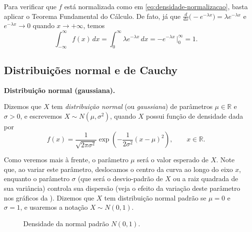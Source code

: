 \documentclass[12pt,portuguese]{article}
\theoremstyle{definition}
\theoremstyle{plainexercise}
\theoremstyle{starredexercise}
\theoremstyle{definition}
\begin{document}
Para verificar que $f$ está normalizada como em \eqref{eq:densidade-normalizacao},
basta aplicar o Teorema Fundamental do Cálculo. De fato, já que 
$\frac{d}{dx}\bigl(-e^{-\lambda x}\bigr) = \lambda e^{-\lambda x}$ e
$e^{-\lambda x}\to 0$ quando $x\to+\infty$, temos 
\[
  \int_{-\infty}^{\infty} f(x)\,dx
  = \int_0^{\infty} \lambda e^{-\lambda x}\,dx
  = -e^{-\lambda x}\,\Big|_{0}^{\infty} = 1.
\]

\subsection{Distribuições normal e de Cauchy}

\medskip
\noindent\textbf{Distribuição normal (gaussiana).}

Dizemos que $X$ tem \emph{distribuição normal} (ou \emph{gaussiana}) de
parâmetros $\mu\in\mathbb{R}$ e $\sigma>0$, e escrevemos
$X\sim N(\mu,\sigma^2)$, quando $X$ possui função de densidade dada por
\begin{equation}
  f(x) = \frac{1}{\sqrt{2\pi\sigma^2}}
  \exp\!\left(-\frac{1}{2\sigma^2}(x-\mu)^2\right),
  \qquad x \in \mathbb{R}.
  \label{eq:dens-normal}
\end{equation}

Como veremos mais à frente, o parâmetro $\mu$ será o valor esperado de $X$. 
Note que, ao variar este parâmetro, deslocamos o centro da curva ao longo do eixo $x$, enquanto o
parâmetro $\sigma$ (que será o desvio-padrão de $X$ ou a raiz quadrada de sua variância)
controla sua dispersão (veja o efeito da variação 
deste parâmetro nos gráficos da ). 
Dizemos que $X$ tem distribuição normal padrão se
$\mu=0$ e $\sigma=1$, e usaremos a notação $X\sim N(0,1)$.

\begin{figure}[H]
\centering
{}
\caption{Densidade da normal padrão $N(0,1)$.}
\label{fig:densidade-normal-padrao}
\end{figure}
\end{document}
